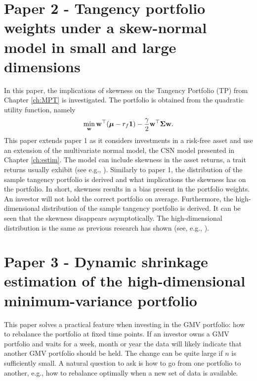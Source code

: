 \documentclass[12pt, oneside]{book}\usepackage{knitr}
\begin{document}
{\section{Paper 2 - Tangency portfolio weights under a skew-normal model in small and large dimensions}\label{sec:paper2}
In this paper, the implications of skewness on the Tangency Portfolio (TP) from Chapter \ref{ch:MPT} is investigated. 
The portfolio is obtained from the quadratic utility function, namely
\begin{equation}
  \min_{\mathbf{w}} \mathbf{w}^\top (\mbox{\boldmath$\mu$} -r_f\mathbf{1}) - \frac{\gamma}{2} \mathbf{w}^\top \mathbf{\Sigma} \mathbf{w}.
\end{equation}
This paper extends paper 1 as it considers investments in a risk-free asset and use an extension of the multivariate normal model, the CSN model presented in Chapter \ref{ch:estim}. 
The model can include skewness in the asset returns, a trait returns usually exhibit (see e.g., \citet{cont2001empirical}). 
Similarly to paper 1, the distribution of the sample tangency portfolio is derived and what implications the skewness has on the portfolio.
In short, skewness results in a bias present in the portfolio weights. 
An investor will not hold the correct portfolio on average.
Furthermore, the high-dimensional distribution of the sample tangency portfolio is derived.
It can be seen that the skewness disappears asymptotically. 
The high-dimensional distribution is the same as previous research has shown (see, e.g., \citet{karlsson2021statistical}).

\section{Paper 3 - Dynamic shrinkage estimation of the high-dimensional minimum-variance portfolio}\label{sec:paper3}
This paper solves a practical feature when investing in the GMV portfolio: how to rebalance the portfolio at fixed time points. 
If an investor owns a GMV portfolio and waits for a week, month or year the data will likely indicate that another GMV portfolio should be held.
The change can be quite large if $n$ is sufficiently small.
A natural question to ask is how to go from one portfolio to another, e.g., how to rebalance optimally when a new set of data is available. 

}
\end{document}
